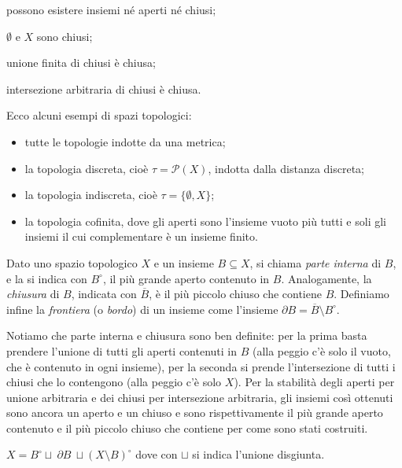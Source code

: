 \documentclass{article}
\begin{document}
\begin{oss}
\begin{nlist}
\item possono esistere insiemi né aperti né chiusi;
\item $\emptyset$ e $X$ sono chiusi;
\item unione finita di chiusi è chiusa;
\item intersezione arbitraria di chiusi è chiusa.
\end{nlist}
\end{oss}

\begin{ex}
Ecco alcuni esempi di spazi topologici:
\begin{itemize}
\item tutte le topologie indotte da una metrica;
\item la topologia discreta, cioè $\tau=\mathcal{P}(X)$, indotta dalla distanza
discreta;
\item la topologia indiscreta, cioè $\tau=\{ \emptyset, X \}$;
\item la topologia cofinita, dove gli aperti sono l'insieme vuoto più tutti e
soli gli insiemi il cui complementare è un insieme finito.
\end{itemize}
\end{ex}

\begin{defn}
	Dato uno spazio topologico $X$ e un insieme $B \subseteq X$, si chiama \textit{parte interna} di $B$, e la si indica con $B^{\circ}$, il più grande aperto contenuto in $B$. Analogamente, la \textit{chiusura} di $B$, indicata con $\overline{B}$, è il più piccolo chiuso che contiene $B$. Definiamo infine la \textit{frontiera} (o \textit{bordo}) di un insieme come l'insieme $\partial B= \overline{B} \setminus B^{\circ}$.
\end{defn}

Notiamo che parte interna e chiusura sono ben definite: per la prima basta prendere l'unione di tutti gli aperti contenuti in $B$ (alla peggio c'è solo il vuoto, che è contenuto in ogni insieme), per la seconda si prende l'intersezione di tutti i chiusi che lo contengono (alla peggio c'è solo $X$). Per la stabilità degli aperti per unione arbitraria e dei chiusi per intersezione arbitraria, gli insiemi così ottenuti sono ancora un aperto e un chiuso e sono rispettivamente il più grande aperto contenuto e il più piccolo chiuso che contiene per come sono stati costruiti.

\begin{ftt}
	$X= B^{\circ} \sqcup\ \partial B\ \sqcup (X
	\setminus B)^{\circ}$ dove con $\sqcup$ si indica l'unione disgiunta.
\end{ftt}
\end{document}
